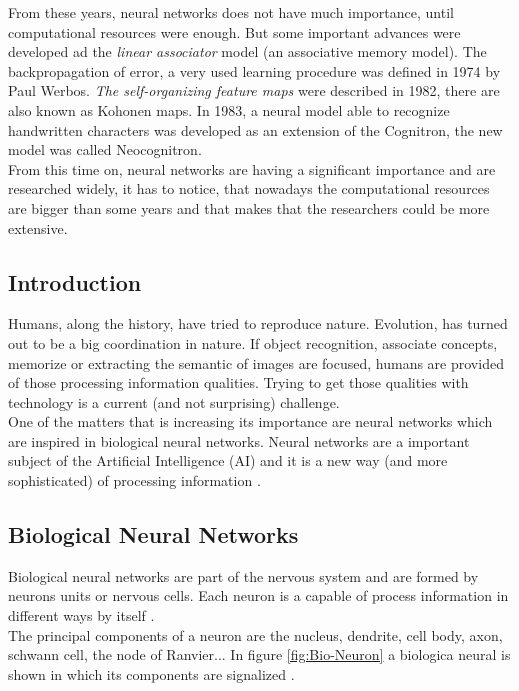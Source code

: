 From these years, neural networks does not have much importance, until computational resources were enough. But some important advances were developed ad the \textit{linear associator} model (an associative memory model). The backpropagation of error, a very used learning procedure was defined in 1974 by Paul Werbos. \textit{The self-organizing feature maps} were described in 1982, there are also known as Kohonen maps. In 1983, a neural model able to recognize handwritten characters was developed as an extension of the Cognitron, the new model was called Neocognitron.\\

From this time on, neural networks are having a significant importance and are researched widely, it has to notice, that nowadays the computational resources are bigger than some years and that makes that the researchers could be more extensive.\\

\subsection{Introduction}
Humans, along the history, have tried to reproduce nature. Evolution, has turned out to be a big coordination in nature. If object recognition, associate concepts, memorize or extracting the semantic of images are focused, humans are provided of those processing information qualities. Trying to get those qualities with technology is a current (and not surprising) challenge.\\

One of the matters that is increasing its importance are neural networks which are inspired in biological neural networks. Neural networks are a important subject of the Artificial Intelligence (AI) and it is a new way (and more sophisticated) of processing information \cite{Rojas}.\\

\subsection{Biological Neural Networks}
Biological neural networks are part of the nervous system and are formed by neurons units or nervous cells. Each neuron is a capable of process information in different ways by itself \cite{Rojas}.\\

The principal components of a neuron are the nucleus, dendrite, cell body, axon, schwann cell, the node of Ranvier... In figure \ref{fig:Bio-Neuron} a biologica neural is shown in which its components are signalized \cite{BINN}.\\

